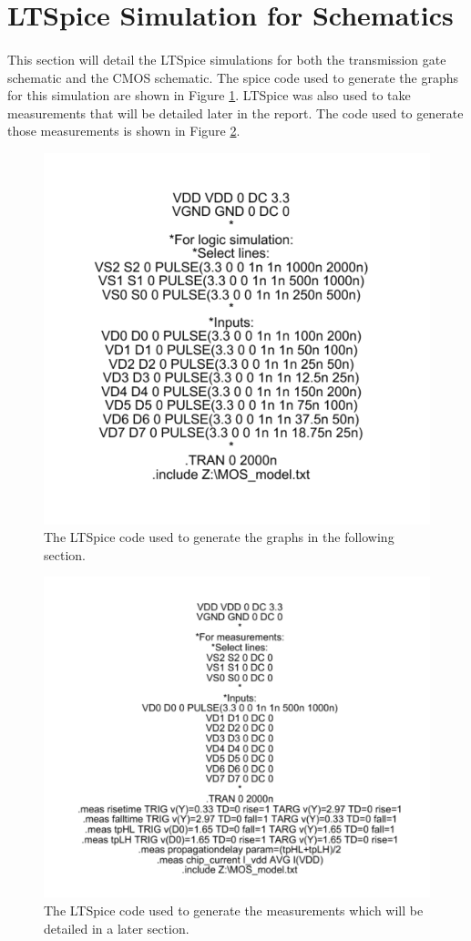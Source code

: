 \documentclass{article}
\begin{document}
\section{LTSpice Simulation for Schematics}
  \paragraph{}
  This section will detail the LTSpice simulations for both the transmission gate schematic and the CMOS schematic. The spice code used to generate the graphs for this simulation are shown in Figure \ref{fig:simcode}. LTSpice was also used to take measurements that will be detailed later in the report. The code used to generate those measurements is shown in Figure \ref{fig:meascode}.

  \begin{figure}[H]
    \centering
    \includegraphics[width=0.5\linewidth, frame]{screenshots/spice-sim-code.png}
    \caption{The LTSpice code used to generate the graphs in the following section.}
    \label{fig:simcode}
  \end{figure}

  \begin{figure}[H]
    \centering
    \includegraphics[width=0.5\linewidth, frame]{screenshots/spice-meas-code.png}
    \caption{The LTSpice code used to generate the measurements which will be detailed in a later section.}
    \label{fig:meascode}
  \end{figure}
\end{document}
